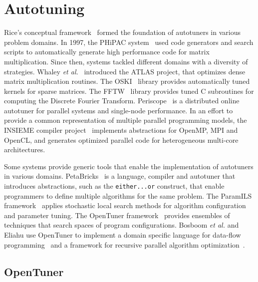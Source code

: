 \section{Autotuning}
\label{chap:autotuning}

Rice's conceptual framework~\cite{rice1976algorithm} formed the foundation
of autotuners in various problem domains.  In 1997, the PHiPAC
system~\cite{bilmes1997optimizing} used code generators and search scripts to
automatically generate high performance code
for matrix multiplication. Since then, systems tackled different domains with a
diversity of strategies. Whaley \emph{et al.}~\cite{dongarra1998automatically}
introduced the ATLAS project, that optimizes dense matrix multiplication
routines. The OSKI~\cite{vuduc2005oski} library provides automatically tuned
kernels for sparse matrices. The FFTW~\cite{frigo1998fftw} library provides
tuned C subroutines for computing the Discrete Fourier Transform.
Periscope~\cite{gerndt2010automatic} is a distributed online autotuner for
parallel systems and single-node performance.  In an effort to provide a common
representation of multiple parallel programming models, the INSIEME compiler
project~\cite{jordan2012multi} implements abstractions for OpenMP, MPI and
OpenCL, and generates optimized parallel code for heterogeneous multi-core
architectures.

Some systems provide generic tools that enable the implementation of
autotuners in various domains. PetaBricks~\cite{ansel2009petabricks} is a
language, compiler and autotuner that introduces abstractions, such as the
\texttt{\footnotesize either...or} construct, that enable programmers to define
multiple algorithms for the same problem.  The ParamILS
framework~\cite{hutter2009paramils} applies stochastic local search methods
for algorithm configuration and parameter tuning. The OpenTuner
framework~\cite{ansel2014opentuner} provides ensembles of techniques that
search spaces of program configurations. Bosboom \emph{et al.} and Eliahu use
OpenTuner to implement a domain specific language for data-flow
programming~\cite{bosboom2014streamjit} and a framework for recursive parallel
algorithm optimization~\cite{eliahu2015frpa}.

\subsection{OpenTuner}
\label{sec:opentuner}

